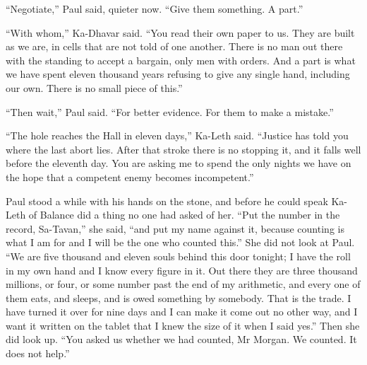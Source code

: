 ``Negotiate,'' Paul said, quieter now. ``Give them something. A part.''\par

``With whom,'' Ka-Dhavar said. ``You read their own paper to us. They are built as we are, in cells that are not told of one another. There is no man out there with the standing to accept a bargain, only men with orders. And a part is what we have spent eleven thousand years refusing to give any single hand, including our own. There is no small piece of this.''\par

``Then wait,'' Paul said. ``For better evidence. For them to make a mistake.''\par

``The hole reaches the Hall in eleven days,'' Ka-Leth said. ``Justice has told you where the last abort lies. After that stroke there is no stopping it, and it falls well before the eleventh day. You are asking me to spend the only nights we have on the hope that a competent enemy becomes incompetent.''\par

Paul stood a while with his hands on the stone, and before he could speak Ka-Leth of Balance did a thing no one had asked of her. ``Put the number in the record, Sa-Tavan,'' she said, ``and put my name against it, because counting is what I am for and I will be the one who counted this.'' She did not look at Paul. ``We are five thousand and eleven souls behind this door tonight; I have the roll in my own hand and I know every figure in it. Out there they are three thousand millions, or four, or some number past the end of my arithmetic, and every one of them eats, and sleeps, and is owed something by somebody. That is the trade. I have turned it over for nine days and I can make it come out no other way, and I want it written on the tablet that I knew the size of it when I said yes.'' Then she did look up. ``You asked us whether we had counted, Mr Morgan. We counted. It does not help.''\par

